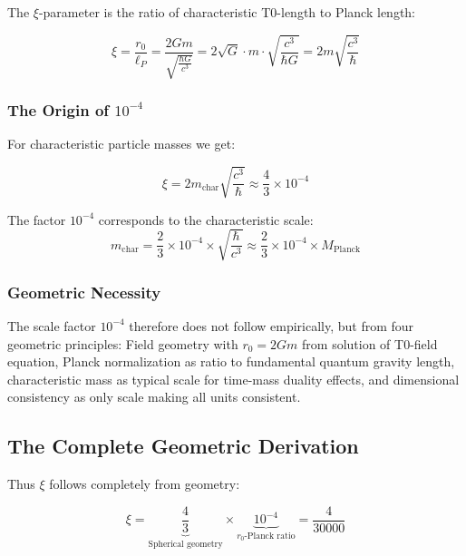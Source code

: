 \documentclass[12pt,a4paper]{report}
\begin{document}
	The $\xi$-parameter is the ratio of characteristic T0-length to Planck length:
	
	\begin{equation}
		\xi = \frac{r_0}{\ell_P} = \frac{2Gm}{\sqrt{\frac{\hbar G}{c^3}}} = 2\sqrt{G} \cdot m \cdot \sqrt{\frac{c^3}{\hbar G}} = 2m\sqrt{\frac{c^3}{\hbar}}
	\end{equation}
	
	\subsubsection{The Origin of $10^{-4}$}
	
	For characteristic particle masses we get:
	
	\begin{equation}
		\xi = 2m_{\text{char}} \sqrt{\frac{c^3}{\hbar}} \approx \frac{4}{3} \times 10^{-4}
	\end{equation}
	
	The factor $10^{-4}$ corresponds to the characteristic scale:
	\begin{equation}
		m_{\text{char}} = \frac{2}{3} \times 10^{-4} \times \sqrt{\frac{\hbar}{c^3}} \approx \frac{2}{3} \times 10^{-4} \times M_{\text{Planck}}
	\end{equation}
	
	\subsubsection{Geometric Necessity}
	
	The scale factor $10^{-4}$ therefore does not follow empirically, but from four geometric principles: Field geometry with $r_0 = 2Gm$ from solution of T0-field equation, Planck normalization as ratio to fundamental quantum gravity length, characteristic mass as typical scale for time-mass duality effects, and dimensional consistency as only scale making all units consistent.
	
	\subsection{The Complete Geometric Derivation}
	
	Thus $\xi$ follows completely from geometry:
	
	\begin{equation}
		\boxed{\xi = \underbrace{\frac{4}{3}}_{\text{Spherical geometry}} \times \underbrace{10^{-4}}_{\text{$r_0$-Planck ratio}} = \frac{4}{30000}}
	\end{equation}
	
\end{document}
